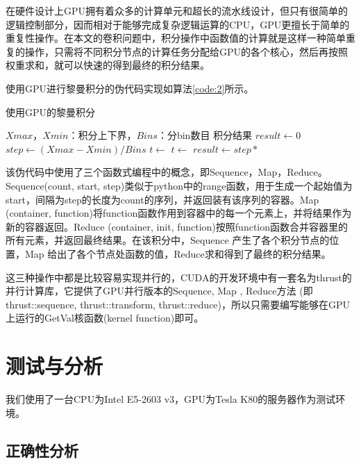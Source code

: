 在硬件设计上GPU拥有着众多的计算单元和超长的流水线设计，但只有很简单的逻辑控制部分，因而相对于能够完成复杂逻辑运算的CPU，GPU更擅长于简单的重复性操作。在本文的卷积问题中，积分操作中函数值的计算就是这样一种简单重复的操作，只需将不同积分节点的计算任务分配给GPU的各个核心，然后再按照权重求和，就可以快速的得到最终的积分结果。

使用GPU进行黎曼积分的伪代码实现如算法\ref{code:2}所示。
\begin{algorithm}  
    \caption{使用GPU的黎曼积分}  
    \begin{algorithmic}[1] 
        \Require 
            $Xmax$，$Xmin$：积分上下界，$Bins$：分bin数目
        \Ensure 
            积分结果
            \State $result \gets 0$  
            \State $step \gets (Xmax - Xmin) / Bins$
            \State $t \gets $
            \State $t \gets $
            \State $result \gets step * $
            \State {}
        \EndFunction

    \end{algorithmic}  
    \label{code:2}
\end{algorithm} 
该伪代码中使用了三个函数式编程中的概念，即Sequence，Map，Reduce。 Sequence(count, start, step)类似于python中的range函数，用于生成一个起始值为start，间隔为step的长度为count的序列，并返回装有该序列的容器。Map (container, function)将function函数作用到容器中的每一个元素上，并将结果作为新的容器返回。Reduce (container, init, function)按照function函数合并容器里的所有元素，并返回最终结果。在该积分中，Sequence 产生了各个积分节点的位置，Map 给出了各个节点处函数的值，Reduce求和得到了最终的积分结果。

这三种操作中都是比较容易实现并行的，CUDA的开发环境中有一套名为thrust的并行计算库\supercite{thrust}，它提供了GPU并行版本的Sequence, Map , Reduce方法 (即 thrust::sequence, thrust::transform, thrust::reduce)，所以只需要编写能够在GPU上运行的GetVal核函数(kernel function)即可。

\section{测试与分析}

我们使用了一台CPU为Intel E5-2603 v3，GPU为Tesla K80的服务器作为测试环境。

\subsection{正确性分析}

